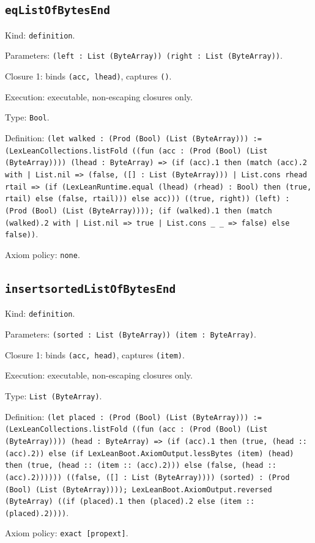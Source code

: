 \documentclass[11pt]{article}
\begin{document}
\subsection*{\texttt{eqListOfBytesEnd}}
\noindent Kind: \texttt{definition}.\par
\noindent Parameters: \texttt{(left : List (ByteArray)) (right : List (ByteArray))}.\par
\noindent Closure 1: binds \texttt{(acc, lhead)}, captures \texttt{()}.\par
\noindent Execution: executable, non-escaping closures only.\par
\noindent Type: \texttt{Bool}.\par
\noindent Definition: \texttt{(let walked : (Prod (Bool) (List (ByteArray))) := (LexLeanCollections.listFold ((fun (acc : (Prod (Bool) (List (ByteArray)))) (lhead : ByteArray) => (if (acc).1 then (match (acc).2 with | List.nil => (false, ([] : List (ByteArray))) | List.cons rhead rtail => (if (LexLeanRuntime.equal (lhead) (rhead) : Bool) then (true, rtail) else (false, rtail))) else acc))) ((true, right)) (left) : (Prod (Bool) (List (ByteArray)))); (if (walked).1 then (match (walked).2 with | List.nil => true | List.cons \_ \_ => false) else false))}.\par
\noindent Axiom policy: \texttt{none}.\par
\subsection*{\texttt{insertsortedListOfBytesEnd}}
\noindent Kind: \texttt{definition}.\par
\noindent Parameters: \texttt{(sorted : List (ByteArray)) (item : ByteArray)}.\par
\noindent Closure 1: binds \texttt{(acc, head)}, captures \texttt{(item)}.\par
\noindent Execution: executable, non-escaping closures only.\par
\noindent Type: \texttt{List (ByteArray)}.\par
\noindent Definition: \texttt{(let placed : (Prod (Bool) (List (ByteArray))) := (LexLeanCollections.listFold ((fun (acc : (Prod (Bool) (List (ByteArray)))) (head : ByteArray) => (if (acc).1 then (true, (head :: (acc).2)) else (if LexLeanBoot.AxiomOutput.lessBytes (item) (head) then (true, (head :: (item :: (acc).2))) else (false, (head :: (acc).2)))))) ((false, ([] : List (ByteArray)))) (sorted) : (Prod (Bool) (List (ByteArray)))); LexLeanBoot.AxiomOutput.reversed (ByteArray) ((if (placed).1 then (placed).2 else (item :: (placed).2))))}.\par
\noindent Axiom policy: \texttt{exact [propext]}.\par
\end{document}

